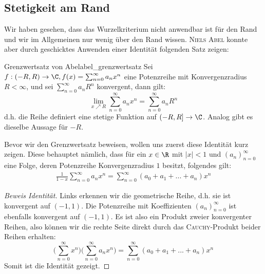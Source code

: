 \subsection{Stetigkeit am Rand}
Wir haben gesehen, dass das Wurzelkriterium nicht anwendbar ist für den Rand und wir im Allgemeinen nur wenig über den Rand wissen. \textsc{Niels Abel} konnte aber durch geschicktes Anwenden einer Identität folgenden Satz zeigen: 

\begin{satz}{Grenzwertsatz von Abel}{abel_grenzwertsatz}
Sei $f: (-R, R) \to \C, f(x) = \sum_{n=0}^\infty a_n x^n$ eine Potenzreihe mit Konvergenzradius $R < \infty$, und sei $\sum_{n=0}^\infty a_n R^n$ konvergent, dann gilt:
$$\lim_{x \nearrow R}\sum_{n=0}^\infty a_n x^n = \sum_{n=0}^\infty a_n R^n$$
d.h. die Reihe definiert eine stetige Funktion auf $(-R, R] \to \C$. Analog gibt es dieselbe Aussage für $-R$.
\end{satz}

Bevor wir den Grenzwertsatz beweisen, wollen uns zuerst diese Identität kurz zeigen. Diese behauptet nämlich, dass für ein $x \in \R$ mit $|x|<1$ und $(a_n)_{n=0}^\infty$ eine Folge, deren Potenzreihe Konvergenzradius $1$ besitzt, folgendes gilt:
\begin{align}\label{eq_identity_abel}
    \frac{1}{1-x}\sum_{n=0}^\infty a_n x^n = \sum_{n=0}^\infty (a_0 + a_1 + ... + a_n) x^n
\end{align}

\begin{proof}[Beweis Identität] Links erkennen wir die geometrische Reihe, d.h. sie ist konvergent auf $(-1,1)$. Die Potenzreihe mit Koeffizienten $(a_n)_{n=0}^\infty$ ist ebenfalls konvergent auf $(-1,1)$. Es ist also ein Produkt zweier konvergenter Reihen, also können wir die rechte Seite direkt durch das \textsc{Cauchy}-Produkt beider Reihen erhalten:
$$\Big(\sum_{n=0}^\infty x^n\Big) \Big(\sum_{n=0}^\infty a_n x^n\Big) = \sum_{n=0}^\infty (a_0 + a_1 + ... + a_n) x^n$$
Somit ist die Identität gezeigt.
\end{proof}

